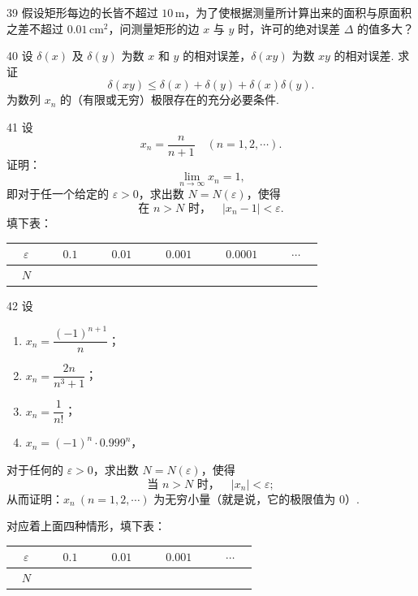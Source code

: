 \begin{prob}[M]{39}
假设矩形每边的长皆不超过 $10\,\mathrm{m}$，为了使根据测量所计算出来的面积与原面积之差不超过 $0.01\,\mathrm{cm}^2$，问测量矩形的边 $x$ 与 $y$ 时，许可的绝对误差 $\Delta$ 的值多大？
\end{prob}

\begin{prob}[M]{40}
设 $\delta(x)$ 及 $\delta(y)$ 为数 $x$ 和 $y$ 的相对误差，$\delta(xy)$ 为数 $xy$ 的相对误差. 求证
\[
\delta(xy) \leqslant \delta(x) + \delta(y) + \delta(x)\delta(y).
\]
为数列 $x_n$ 的（有限或无穷）极限存在的充分必要条件.
\end{prob}


\begin{prob}[M]{41}
设
\[
x_n = \frac{n}{n+1} \quad (n=1,2,\cdots).
\]
证明：
\[
\lim_{n\to\infty} x_n = 1,
\]
即对于任一个给定的 $\varepsilon > 0$，求出数 $N = N(\varepsilon)$，使得
\[
\text{在 } n > N \text{ 时，} \quad |x_n - 1| < \varepsilon.
\]
填下表：
\begin{center}
\begin{tabular}{c|c|c|c|c|c}
\hline
$\quad \varepsilon \quad$ & $\quad 0.1 \quad$ & $\quad 0.01 \quad$ & $\quad 0.001 \quad$ & $\quad 0.0001 \quad$ & $\quad \cdots \quad$ \\
\hline
$N$ & & & & & \\
\hline
\end{tabular}
\end{center}
\end{prob}

\begin{prob}[L]{42}
设
\begin{enumerate}[label=(\alph*), itemsep=2pt, topsep=3pt]
\item $x_n = \dfrac{(-1)^{n+1}}{n}$；
\item $x_n = \dfrac{2n}{n^3+1}$；
\item $x_n = \dfrac{1}{n!}$；
\item $x_n = (-1)^n \cdot 0.999^n$，
\end{enumerate}
对于任何的 $\varepsilon > 0$，求出数 $N = N(\varepsilon)$，使得
\[
\text{当 } n > N \text{ 时，} \quad |x_n| < \varepsilon;
\]
从而证明：$x_n\ (n=1,2,\cdots)$ 为无穷小量（就是说，它的极限值为 $0$）.

对应着上面四种情形，填下表：
\begin{center}
\begin{tabular}{c|c|c|c|c}
\hline
$\quad \varepsilon \quad$ & $\quad 0.1 \quad$ & $\quad 0.01 \quad$ & $\quad 0.001 \quad$ & $\quad \cdots \quad$ \\
\hline
$N$ & & & & \\
\hline
\end{tabular}
\end{center}
\end{prob}

